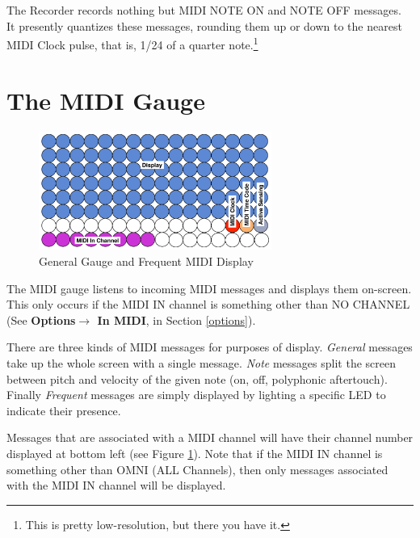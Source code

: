 \documentclass{article}
\begin{document}
The Recorder records nothing but MIDI NOTE ON and NOTE OFF messages.  It presently quantizes these messages, rounding them up or down to the nearest MIDI Clock pulse, that is, 1/24 of a quarter note.\footnote{This is pretty low-resolution, but there you have it.}

\section {The MIDI Gauge}

\begin{figure}
\vspace{-6em}\includegraphics[width=3in]{GeneralGauge.pdf}
\vspace{-2em}\caption{\small General Gauge and Frequent MIDI Display}\vspace{-2em}
\label{generalgauge}
\end{figure}

The MIDI gauge listens to incoming MIDI messages and displays them on-screen.  This only occurs if the MIDI IN channel is something other than NO CHANNEL (See {\bf Options\(\boldsymbol\rightarrow\) In MIDI}, in Section \ref{options}).

There are three kinds of MIDI messages for purposes of display.  {\it General} messages take up the whole screen with a single message.  {\it Note} messages split the screen between pitch and velocity of the given note (on, off, polyphonic aftertouch).  Finally {\it Frequent} messages are simply displayed by lighting a specific LED to indicate their presence. 

Messages that are associated with a MIDI channel will have their channel number displayed at bottom left (see Figure \ref{generalgauge}).  Note that if the MIDI IN channel is something other than OMNI (ALL Channels), then only messages associated with the MIDI IN channel will be displayed.
\end{document}
